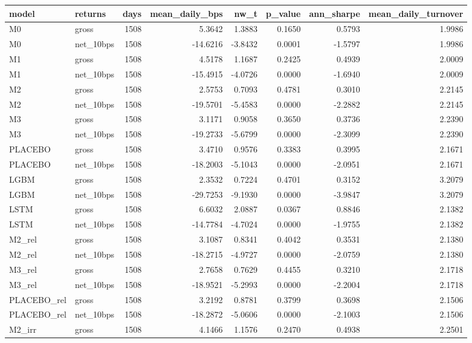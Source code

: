 \begin{tabular}{llrrrrrr}
\toprule
model & returns & days & mean\_daily\_bps & nw\_t & p\_value & ann\_sharpe & mean\_daily\_turnover \\
\midrule
M0 & gross & 1508 & 5.3642 & 1.3883 & 0.1650 & 0.5793 & 1.9986 \\
M0 & net\_10bps & 1508 & -14.6216 & -3.8432 & 0.0001 & -1.5797 & 1.9986 \\
M1 & gross & 1508 & 4.5178 & 1.1687 & 0.2425 & 0.4939 & 2.0009 \\
M1 & net\_10bps & 1508 & -15.4915 & -4.0726 & 0.0000 & -1.6940 & 2.0009 \\
M2 & gross & 1508 & 2.5753 & 0.7093 & 0.4781 & 0.3010 & 2.2145 \\
M2 & net\_10bps & 1508 & -19.5701 & -5.4583 & 0.0000 & -2.2882 & 2.2145 \\
M3 & gross & 1508 & 3.1171 & 0.9058 & 0.3650 & 0.3736 & 2.2390 \\
M3 & net\_10bps & 1508 & -19.2733 & -5.6799 & 0.0000 & -2.3099 & 2.2390 \\
PLACEBO & gross & 1508 & 3.4710 & 0.9576 & 0.3383 & 0.3995 & 2.1671 \\
PLACEBO & net\_10bps & 1508 & -18.2003 & -5.1043 & 0.0000 & -2.0951 & 2.1671 \\
LGBM & gross & 1508 & 2.3532 & 0.7224 & 0.4701 & 0.3152 & 3.2079 \\
LGBM & net\_10bps & 1508 & -29.7253 & -9.1930 & 0.0000 & -3.9847 & 3.2079 \\
LSTM & gross & 1508 & 6.6032 & 2.0887 & 0.0367 & 0.8846 & 2.1382 \\
LSTM & net\_10bps & 1508 & -14.7784 & -4.7024 & 0.0000 & -1.9755 & 2.1382 \\
M2\_rel & gross & 1508 & 3.1087 & 0.8341 & 0.4042 & 0.3531 & 2.1380 \\
M2\_rel & net\_10bps & 1508 & -18.2715 & -4.9727 & 0.0000 & -2.0759 & 2.1380 \\
M3\_rel & gross & 1508 & 2.7658 & 0.7629 & 0.4455 & 0.3210 & 2.1718 \\
M3\_rel & net\_10bps & 1508 & -18.9521 & -5.2993 & 0.0000 & -2.2004 & 2.1718 \\
PLACEBO\_rel & gross & 1508 & 3.2192 & 0.8781 & 0.3799 & 0.3698 & 2.1506 \\
PLACEBO\_rel & net\_10bps & 1508 & -18.2872 & -5.0606 & 0.0000 & -2.1003 & 2.1506 \\
M2\_irr & gross & 1508 & 4.1466 & 1.1576 & 0.2470 & 0.4938 & 2.2501 \\

\end{tabular}
